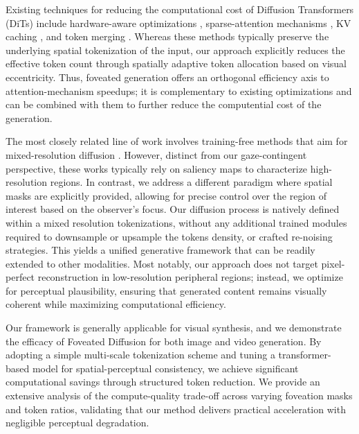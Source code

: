 Existing techniques for reducing the computational cost of Diffusion Transformers (DiTs) include hardware-aware optimizations \cite{dao2022flashattention}, sparse-attention mechanisms \cite{zhang2025spargeattn, xi2025sparsevideogen}, KV caching \cite{yin2025causvid, huang2025selfforcing}, and token merging \cite{bolya2022tome, lu2025toma}.
% 
Whereas these methods typically preserve the underlying spatial tokenization of the input, our approach explicitly reduces the effective token count through spatially adaptive token allocation based on visual eccentricity. 
% 
Thus, foveated generation offers an orthogonal efficiency axis to attention-mechanism speedups; it is complementary to existing optimizations and can be combined with them to further reduce the computential cost of the generation.
% 


The most closely related line of work involves training-free methods that aim for mixed-resolution diffusion \cite{jeong2025upsample, wu2025crpa}.
% 
However, distinct from our gaze-contingent perspective, these works typically rely on saliency maps to characterize high-resolution regions. 
% 
% 
In contrast, we address a different paradigm where spatial masks are explicitly provided, allowing for precise control over the region of interest based on the observer's focus. 
% 
Our diffusion process is natively defined within a mixed resolution tokenizations, without any additional trained modules required to downsample or upsample the tokens density, or crafted re-noising strategies. This yields a unified generative framework that can be readily extended to other modalities.
% 
Most notably, our approach does not target pixel-perfect reconstruction in low-resolution peripheral regions; instead, we optimize for perceptual plausibility, ensuring that generated content remains visually coherent while maximizing computational efficiency.


Our framework is generally applicable for visual synthesis, and we demonstrate the efficacy of Foveated Diffusion for both image and video generation.
% 
By adopting a simple multi-scale tokenization scheme and tuning a transformer-based model for spatial-perceptual consistency, we achieve significant computational savings through structured token reduction.
% 
We provide an extensive analysis of the compute-quality trade-off across varying foveation masks and token ratios, validating that our method delivers practical acceleration with negligible perceptual degradation.

